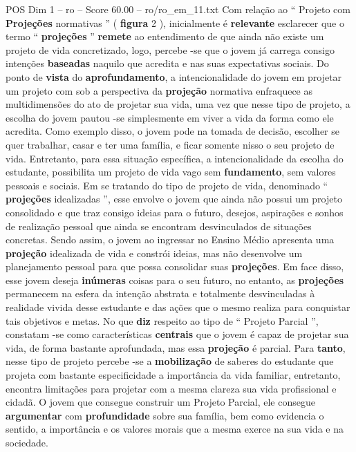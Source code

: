 \begin{textsample}{POS Dim 1 – ro – Score 60.00 – ro/ro\_em\_11.txt}
Com relação ao “ Projeto com \textbf{Projeções} normativas ” ( \textbf{figura} 2 ), inicialmente é \textbf{relevante} esclarecer que o termo “ \textbf{projeções} ” \textbf{remete} ao entendimento de que ainda não existe um projeto de vida concretizado, logo, percebe -se que o jovem já carrega consigo intenções \textbf{baseadas} naquilo que acredita e nas suas expectativas sociais.
Do ponto de \textbf{vista} do \textbf{aprofundamento}, a intencionalidade do jovem em projetar um projeto com sob a perspectiva da \textbf{projeção} normativa enfraquece as multidimensões do ato de projetar sua vida, uma vez que nesse tipo de projeto, a escolha do jovem pautou -se simplesmente em viver a vida da forma como ele acredita.
Como exemplo disso, o jovem pode na tomada de decisão, escolher se quer trabalhar, casar e ter uma família, e ficar somente nisso o seu projeto de vida.
Entretanto, para essa situação específica, a intencionalidade da escolha do estudante, possibilita um projeto de vida vago sem \textbf{fundamento}, sem valores pessoais e sociais.
Em se tratando do tipo de projeto de vida, denominado “ \textbf{projeções} idealizadas ”, esse envolve o jovem que ainda não possui um projeto consolidado e que traz consigo ideias para o futuro, desejos, aspirações e sonhos de realização pessoal que ainda se encontram desvinculados de situações concretas.
Sendo assim, o jovem ao ingressar no Ensino Médio apresenta uma \textbf{projeção} idealizada de vida e constrói ideias, mas não desenvolve um planejamento pessoal para que possa consolidar suas \textbf{projeções}.
Em face disso, esse jovem deseja \textbf{inúmeras} coisas para o seu futuro, no entanto, as \textbf{projeções} permanecem na esfera da intenção abstrata e totalmente desvinculadas à realidade vivida desse estudante e das ações que o mesmo realiza para conquistar tais objetivos e metas.
No que \textbf{diz} respeito ao tipo de “ Projeto Parcial ”, constatam -se como características \textbf{centrais} que o jovem é capaz de projetar sua vida, de forma bastante aprofundada, mas essa \textbf{projeção} é parcial.
Para \textbf{tanto}, nesse tipo de projeto percebe -se a \textbf{mobilização} de saberes do estudante que projeta com bastante especificidade a importância da vida familiar, entretanto, encontra limitações para projetar com a mesma clareza sua vida profissional e cidadã.
O jovem que consegue construir um Projeto Parcial, ele consegue \textbf{argumentar} com \textbf{profundidade} sobre sua família, bem como evidencia o sentido, a importância e os valores morais que a mesma exerce na sua vida e na sociedade.

\end{textsample}
